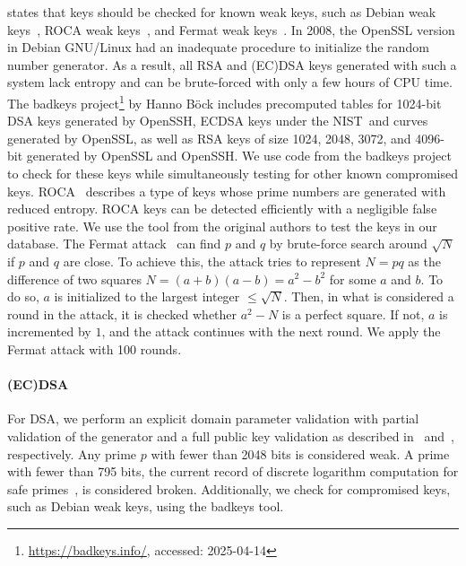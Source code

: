 \cite[Section 6.1.1.3]{ca-browser-forum-2.1.2} states that keys should be checked for known weak keys, such as Debian weak keys~\cite{cve-2008-0166}, ROCA weak keys~\cite{CCS:NSSKM17}, and Fermat weak keys~\cite{EPRINT:Bock23}. In 2008, the OpenSSL version in Debian GNU/Linux had an inadequate procedure to initialize the random number generator. As a result, all RSA and (EC)DSA keys generated with such a system lack entropy and can be brute-forced with only a few hours of CPU time. The badkeys project\footnote{\url{https://badkeys.info/}, accessed: 2025-04-14} by Hanno Böck includes precomputed tables for 1024-bit DSA keys generated by OpenSSH, ECDSA keys under the NIST~\ptwofivesix and \pthreeeightfour curves generated by OpenSSL, as well as RSA keys of size 1024, 2048, 3072, and 4096-bit generated by OpenSSL and OpenSSH. We use code from the badkeys project to check for these keys while simultaneously testing for other known compromised keys. ROCA~\cite{CCS:NSSKM17} describes a type of keys whose prime numbers are generated with reduced entropy. ROCA keys can be detected efficiently with a negligible false positive rate. We use the tool from the original authors to test the keys in our database. The Fermat attack~\cite{EPRINT:Bock23} can find $p$ and $q$ by brute-force search around $\sqrt{N}$ if $p$ and $q$ are close. To achieve this, the attack tries to represent $N = pq$ as the difference of two squares $N = (a + b)(a - b) = a^2 - b^2$ for some $a$ and $b$. To do so, $a$ is initialized to the largest integer $\leq \sqrt{N}$. Then, in what is considered a round in the attack, it is checked whether $a^2 - N$ is a perfect square. If not, $a$ is incremented by $1$, and the attack continues with the next round. We apply the Fermat attack with 100 rounds.

\paragraph{(EC)DSA}

For DSA, we perform an explicit domain parameter validation with partial validation of the generator and a full public key validation as described in~\cite[Section 4.1]{nist-sp-800-89} and~\cite[Section 5.3.1]{nist-sp-800-89}, respectively. Any prime $p$ with fewer than 2048 bits is considered weak. A prime with fewer than 795 bits, the current record of discrete logarithm computation for safe primes~\cite{boudot2019}, is considered broken. Additionally, we check for compromised keys, such as Debian weak keys, using the badkeys tool.

